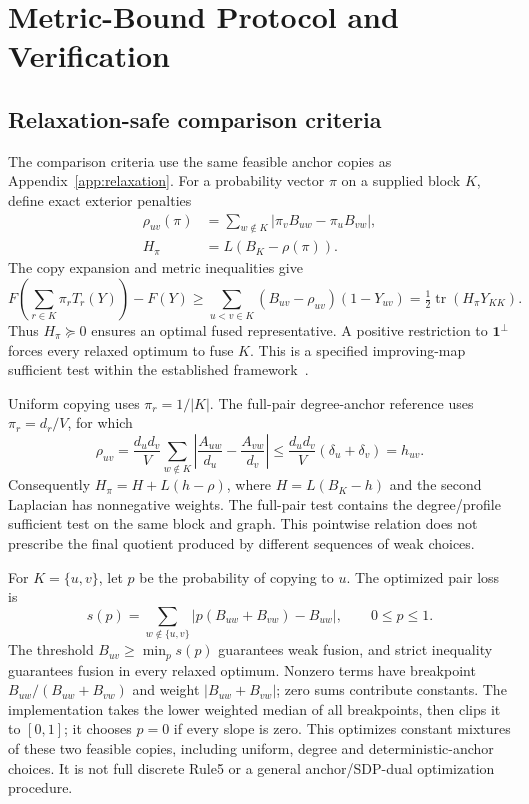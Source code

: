 \documentclass[sigconf,anonymous,review]{acmart}
\newcommand{\1}{\mathbf{1}}
\begin{document}
\section{Metric-Bound Protocol and Verification}\label{app:metric-protocol}
\subsection{Relaxation-safe comparison criteria}
The comparison criteria use the same feasible anchor copies as
Appendix~\ref{app:relaxation}. For a probability vector $\pi$ on a supplied
block $K$, define exact exterior penalties
\begin{align}
 \rho_{uv}(\pi)
 &=\sum_{w\notin K}|\pi_vB_{uw}-\pi_uB_{vw}|,\label{eq:anchor-penalty}\\
 H_\pi&=L(B_K-\rho(\pi)).\nonumber
\end{align}
The copy expansion and metric inequalities give
\[
 F\!\left(\sum_{r\in K}\pi_r T_r(Y)\right)-F(Y)
 \geq\sum_{u<v\in K}(B_{uv}-\rho_{uv})(1-Y_{uv})
 =\tfrac12\operatorname{tr}(H_\pi Y_{KK}).
\]
Thus $H_\pi\succeq0$ ensures an optimal fused representative. A positive
restriction to $\1^\perp$ forces every relaxed optimum to fuse $K$.
This is a specified improving-map sufficient test within the established
framework~\cite{shekhovtsov2014persistency}.

Uniform copying uses $\pi_r=1/|K|$. The full-pair degree-anchor reference
uses $\pi_r=d_r/V$, for which
\[
 \rho_{uv}=\frac{d_ud_v}{V}
 \sum_{w\notin K}\left|\frac{A_{uw}}{d_u}-\frac{A_{vw}}{d_v}\right|
 \leq\frac{d_ud_v}{V}(\delta_u+\delta_v)=h_{uv}.
\]
Consequently $H_\pi=H+L(h-\rho)$, where $H=L(B_K-h)$ and the second
Laplacian has nonnegative weights. The full-pair test contains the
degree/profile sufficient test on the same block and graph. This pointwise
relation does not prescribe the final quotient produced by different
sequences of weak choices.

For $K=\{u,v\}$, let $p$ be the probability of copying to $u$. The
optimized pair loss is
\[
 s(p)=\sum_{w\notin\{u,v\}}
 |p(B_{uw}+B_{vw})-B_{uw}|,\qquad 0\leq p\leq1.
\]
The threshold $B_{uv}\geq\min_p s(p)$ guarantees weak fusion, and strict
inequality guarantees fusion in every relaxed optimum. Nonzero terms have
breakpoint $B_{uw}/(B_{uw}+B_{vw})$ and weight
$|B_{uw}+B_{vw}|$; zero sums contribute constants. The implementation takes
the lower weighted median of all breakpoints, then clips it to $[0,1]$;
it chooses $p=0$ if every slope is zero. This optimizes constant mixtures of these two feasible copies,
including uniform, degree and deterministic-anchor choices. It is not full
discrete Rule5 or a general anchor/SDP-dual optimization procedure.
\end{document}
